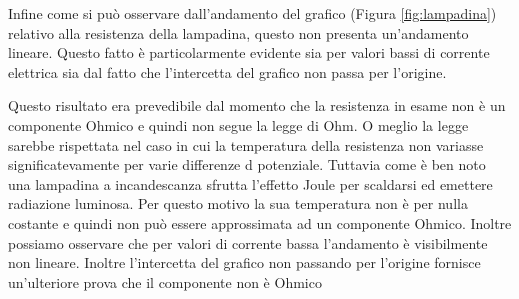 Infine come si può osservare dall'andamento del grafico (Figura \ref{fig:lampadina}) relativo alla resistenza della lampadina, questo non presenta un'andamento lineare.
Questo fatto è particolarmente evidente sia per valori bassi di corrente elettrica sia dal fatto che l'intercetta del grafico non passa per l'origine.

Questo risultato era prevedibile dal momento che la resistenza in esame non è un componente Ohmico e quindi non segue la legge di Ohm.
O meglio la legge sarebbe rispettata nel caso in cui la temperatura della resistenza non variasse significatevamente per varie differenze d potenziale. Tuttavia come è ben noto una lampadina a incandescanza sfrutta l'effetto Joule per scaldarsi ed emettere radiazione luminosa. Per questo motivo la sua temperatura non è per nulla costante e quindi non può essere approssimata ad un componente Ohmico.
Inoltre possiamo osservare che per valori di corrente bassa l'andamento è visibilmente non lineare. Inoltre l'intercetta del grafico non passando per l'origine fornisce un'ulteriore prova che il componente non è Ohmico

